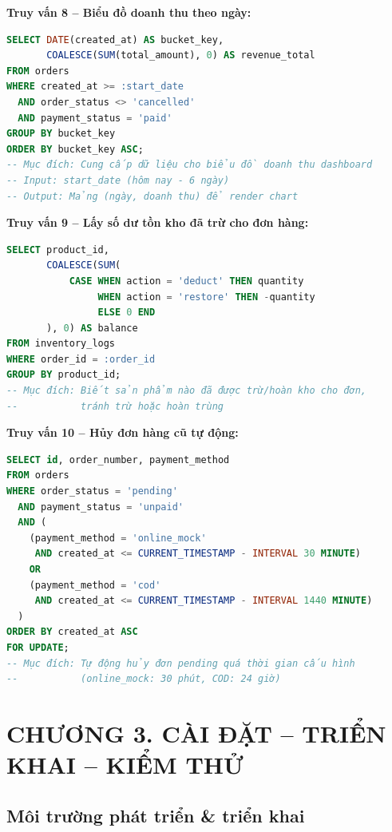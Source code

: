 \documentclass[a4paper]{article}
\begin{document}
\textbf{Truy vấn 8 -- Biểu đồ doanh thu theo ngày:}

\begin{lstlisting}[language=SQL, caption=Doanh thu 7 ngày gần nhất]
SELECT DATE(created_at) AS bucket_key,
       COALESCE(SUM(total_amount), 0) AS revenue_total
FROM orders
WHERE created_at >= :start_date
  AND order_status <> 'cancelled'
  AND payment_status = 'paid'
GROUP BY bucket_key
ORDER BY bucket_key ASC;
-- Mục đích: Cung cấp dữ liệu cho biểu đồ doanh thu dashboard
-- Input: start_date (hôm nay - 6 ngày)
-- Output: Mảng (ngày, doanh thu) để render chart
\end{lstlisting}

\textbf{Truy vấn 9 -- Lấy số dư tồn kho đã trừ cho đơn hàng:}

\begin{lstlisting}[language=SQL, caption=Kiểm tra số lượng đã trừ kho cho đơn]
SELECT product_id,
       COALESCE(SUM(
           CASE WHEN action = 'deduct' THEN quantity
                WHEN action = 'restore' THEN -quantity
                ELSE 0 END
       ), 0) AS balance
FROM inventory_logs
WHERE order_id = :order_id
GROUP BY product_id;
-- Mục đích: Biết sản phẩm nào đã được trừ/hoàn kho cho đơn,
--           tránh trừ hoặc hoàn trùng
\end{lstlisting}

\textbf{Truy vấn 10 -- Hủy đơn hàng cũ tự động:}

\begin{lstlisting}[language=SQL, caption=Tìm đơn hàng quá hạn cần hủy tự động]
SELECT id, order_number, payment_method
FROM orders
WHERE order_status = 'pending'
  AND payment_status = 'unpaid'
  AND (
    (payment_method = 'online_mock' 
     AND created_at <= CURRENT_TIMESTAMP - INTERVAL 30 MINUTE)
    OR
    (payment_method = 'cod' 
     AND created_at <= CURRENT_TIMESTAMP - INTERVAL 1440 MINUTE)
  )
ORDER BY created_at ASC
FOR UPDATE;
-- Mục đích: Tự động hủy đơn pending quá thời gian cấu hình
--           (online_mock: 30 phút, COD: 24 giờ)
\end{lstlisting}

\section{CHƯƠNG 3. CÀI ĐẶT -- TRIỂN KHAI -- KIỂM THỬ}

\subsection{Môi trường phát triển \& triển khai}
\end{document}
